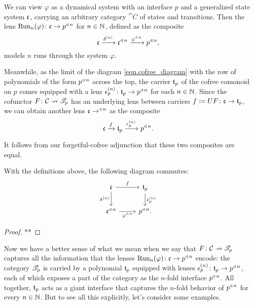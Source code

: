 \documentclass[Book-Poly]{subfiles}
\begin{document}
We can view $\varphi$ as a dynamical system with an interface $p$ and a generalized state system $\mathfrak{c}$, carrying an arbitrary category $\cat{C}$ of states and transitions.
Then the lens $\text{Run}_n(\varphi)\colon\mathfrak{c}\to p^{\mathbin{\triangleleft}\,n}$ for $n\in\mathbb{N}$, defined as the composite
\[
    \mathfrak{c}\xrightarrow{\delta^{(n)}}\mathfrak{c}^{\mathbin{\triangleleft}\,n}\xrightarrow{\varphi^{\mathbin{\triangleleft}\,n}}p^{\mathbin{\triangleleft}\,n},
\]
models $n$ runs through the system $\varphi$.

Meanwhile, as the limit of the diagram \eqref{eqn.cofree_diagram} with the row of polynomials of the form $p^{\mathbin{\triangleleft}\,n}$ across the top, the carrier $\mathfrak{t}_p$ of the cofree comonoid on $p$ comes equipped with a lens $\epsilon^{(n)}_p\colon\mathfrak{t}_p\to p^{\mathbin{\triangleleft}\,n}$ for each $n\in\mathbb{N}$.
Since the cofunctor $F\colon\mathcal{C}\nrightarrow\mathscr{T}_{p}$ has an underlying lens between carriers $f\coloneqq UF\colon\mathfrak{c}\to\mathfrak{t}_p$, we can obtain another lens $\mathfrak{c}\to^{\mathbin{\triangleleft}\,n}$ as the composite
\[
    \mathfrak{c}\xrightarrow{f}\mathfrak{t}_p\xrightarrow{\epsilon^{(n)}_p}p^{\mathbin{\triangleleft}\,n}.
\]

It follows from our forgetful-cofree adjunction that these two composites are equal.

\begin{proposition}
With the definitions above, the following diagram commutes:
\[
\begin{tikzcd}
    \car{c} \ar[r,"f"] \ar[d, "\delta^{(n)}"'] & \car{t}_p \ar[d, "\epsilon^{(n)}_p"] \\
    \car{c}\tripow{n} \ar[r, "\varphi\tripow{n}"'] & p\tripow{n}.
\end{tikzcd}
\]
\end{proposition}
\begin{proof}
**
\end{proof}

Now we have a better sense of what we mean when we say that $F\colon\mathcal{C}\nrightarrow\mathscr{T}_{p}$ captures all the information that the lenses $\text{Run}_n(\varphi)\colon\mathfrak{c}\to p^{\mathbin{\triangleleft}\,n}$ encode: the category $\mathscr{T}_{p}$ is carried by a polynomial $\mathfrak{t}_p$ equipped with lenses $\epsilon^{(n)}_p\colon\mathfrak{t}_p\to p^{\mathbin{\triangleleft}\,n}$, each of which exposes a part of the category as the $n$-fold interface $p^{\mathbin{\triangleleft}\,n}$.
All together, $\mathfrak{t}_p$ acts as a giant interface that captures the $n$-fold behavior of $p^{\mathbin{\triangleleft}\,n}$ for every $n\in\mathbb{N}$.
But to see all this explicitly, let's consider some examples.

\end{document}
